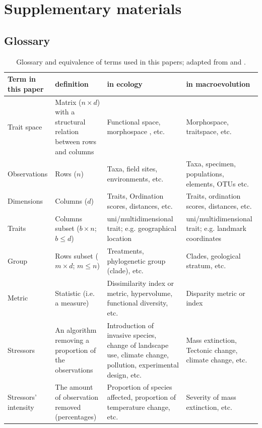 \documentclass[12pt,letterpaper]{article}
\begin{document}
\section{Supplementary materials}

\subsection{Glossary}


\begin{table}[ht]
\caption{Glossary and equivalence of terms used in this papers; adapted from \cite{guillerme2018disprity} and \cite{mammola2021concepts}.}
\centering
\begin{tabular}{p{2.5cm}p{4cm}p{5cm}p{5cm}}
Term in this paper & definition & in ecology & in macroevolution \\
\hline
Trait space & Matrix ($n \times d$) with a structural relation between rows and columns & Functional space, morphospace , etc. & Morphospace, traitspace, etc.  \\
\hline
Observations & Rows ($n$) & Taxa, field sites, environments, etc. & Taxa, specimen, populations, elements, OTUs etc. \\
\hline
Dimensions & Columns ($d$) & Traits, Ordination scores, distances, etc. & Traits, ordination scores, distances, etc. \\
\hline
Traits & Columns subset ($b \times n$; $b \leq d$) & uni/multidimensional trait; e.g. geographical location & uni/multidimensional trait; e.g. landmark coordinates \\
\hline
Group & Rows subset ($m \times d$; $m \leq n$) & Treatments, phylogenetic group (clade), etc. & Clades, geological stratum, etc. \\
\hline
Metric & Statistic (i.e. a measure) & Dissimilarity index or metric, hypervolume, functional diversity, etc. & Disparity metric or index \\
\hline
Stressors & An algorithm removing a proportion of the observations & Introduction of invasive species, change of landscape use, climate change, pollution, experimental design, etc. & Mass extinction, Tectonic change, climate change, etc. \\
\hline
Stressors' intensity & The amount of observation removed (percentages) & Proportion of species affected, proportion of temperature change, etc. & Severity of mass extinction,  etc. \\
\end{tabular}
\end{table}
\end{document}
